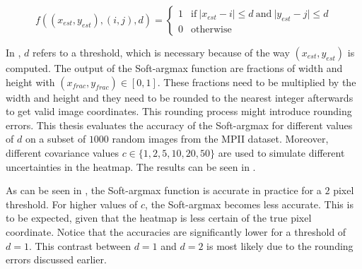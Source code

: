 \begin{equation}
    f((x_{est}, y_{est}), (i,j), d) = 
    \begin{cases}
        1 & \text{if} ~ \lvert x_{est} - i \rvert \leq d ~ \text{and} ~ \lvert y_{est} - j \rvert \leq d \\
        0 & \text{otherwise}
    \end{cases}
    \label{eq:acc_softargmax}
\end{equation}

In , $d$ refers to a threshold, which is necessary because of the way $(x_{est}, y_{est})$ is computed.
The output of the Soft-argmax function are fractions of width and height with $(x_{frac}, y_{frac}) \in [0,1]$.
These fractions need to be multiplied by the width and height and they need to be rounded to the nearest integer afterwards to get valid image coordinates.
This rounding process might introduce rounding errors.
This thesis evaluates the accuracy of the Soft-argmax for different values of $d$ on a subset of $1000$ random images from the MPII dataset.
Moreover, different covariance values $c \in \{1, 2, 5, 10, 20, 50 \}$ are used to simulate different uncertainties in the heatmap.
The results can be seen in .

As can be seen in , the Soft-argmax function is accurate in practice for a $2$ pixel threshold.
For higher values of $c$, the Soft-argmax becomes less accurate.
This is to be expected, given that the heatmap is less certain of the true pixel coordinate.
Notice that the accuracies are significantly lower for a threshold of $d=1$.
This contrast between $d=1$ and $d=2$ is most likely due to the rounding errors discussed earlier.

\begin{table}[]
    \centering
    \caption{Mean average accuracy (in percent) of Soft-argmax when detecting ground truth coordinates from synthetic joint heatmaps. Threshold referrs to the amound of pixels the estimate is allowed to deviate from the ground truth annotation. $c$ referres to the covariance used for creating the synthetic heatmaps. The large discrepancy between a threshold of $1$ and a threshold of $2$ is most likely due to rounding errors.}
    \label{tab:softargmax_numeric_eval}
\end{table}

